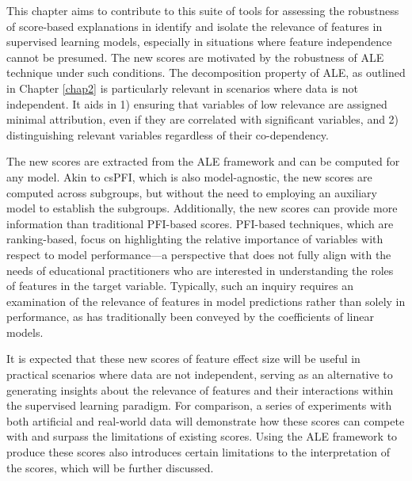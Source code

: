 This chapter aims to contribute to this suite of tools for assessing the robustness of score-based explanations in identify and isolate the relevance of features in supervised learning models, especially in situations where feature independence cannot be presumed. The new scores are motivated by the robustness of \gls{ALE} technique under such conditions. The decomposition property of \gls{ALE}, as outlined in Chapter \ref{chap2} is particularly relevant in scenarios where data is not independent. It aids in 1) ensuring that variables of low relevance are assigned minimal attribution, even if they are correlated with significant variables, and 2) distinguishing relevant variables regardless of their co-dependency.

The new scores are extracted from the \gls{ALE} framework and can be computed for any model. Akin to \gls{csPFI}, which is also model-agnostic, the new scores are computed across subgroups, but without the need to employing an auxiliary model to establish the subgroups. Additionally, the new scores can provide more information than traditional \gls{PFI}-based scores. \gls{PFI}-based techniques, which are ranking-based, focus on highlighting the relative importance of variables with respect to model performance—a perspective that does not fully align with the needs of educational practitioners who are interested in understanding the roles of features in the target variable. Typically, such an inquiry requires an examination of the relevance of features in model predictions rather than solely in performance, as has traditionally been conveyed by the coefficients of linear models.

It is expected that these new scores of feature effect size will be useful in practical scenarios where data are not independent, serving as an alternative to generating insights about the relevance of features and their interactions within the supervised learning paradigm. For comparison, a series of experiments with both artificial and real-world data will demonstrate how these scores can compete with and surpass the limitations of existing scores. Using the \gls{ALE} framework to produce these scores also introduces certain limitations to the interpretation of the scores, which will be further discussed.  